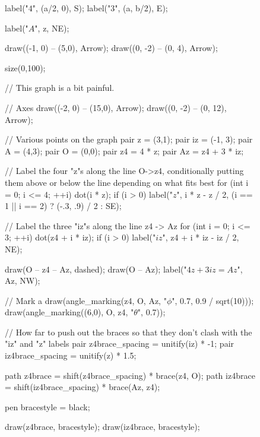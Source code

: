 \documentclass[../textbook.tex]{subfiles}
\begin{document}
\begin{figure}[h]
\begin{center}
\begin{minipage}[b]{0.25\textwidth}
\begin{asy}[width=\textwidth]
				label("$4$", (a/2, 0), S);
				label("$3$", (a, b/2), E);

				label("$A$", z, NE);

				draw((-1, 0) -- (5,0), Arrow);
				draw((0, -2) -- (0, 4), Arrow);
			\end{asy}
		\end{minipage}
		\hfill
		\begin{minipage}[b]{0.4\textwidth}
			\centering
			\begin{asy}[width=0.7\textwidth]
				size(0,100);

				// This graph is a bit painful.

				// Axes
				draw((-2, 0) -- (15,0), Arrow);
				draw((0, -2) -- (0, 12), Arrow);

				// Various points on the graph
				pair z = (3,1);
				pair iz = (-1, 3);
				pair A = (4,3);
				pair O = (0,0);
				pair z4 = 4 * z;
				pair Az = z4 + 3 * iz;

				// Label the four "z"s along the line O->z4, conditionally putting them above or below the line depending on what fits best
				for (int i = 0; i <= 4; ++i) {
					dot(i * z);
					if (i > 0) label("$z$", i * z - z / 2, (i == 1 || i == 2) ? (-.3, .9) / 2 : SE);
				}

				// Label the three "iz"s along the line z4 -> Az
				for (int i = 0; i <= 3; ++i) {
					dot(z4 + i * iz);
					if (i > 0) label("$iz$", z4 + i * iz - iz / 2, NE);
				}

				draw(O -- z4 -- Az, dashed);
				draw(O -- Az);
				label("$4z + 3iz = Az$", Az, NW);

				// Mark a
				draw(angle_marking(z4, O, Az, "$\phi$", 0.7, 0.9 / sqrt(10)));
				draw(angle_marking((6,0), O, z4, "$\theta$", 0.7));

				// How far to push out the braces so that they don't clash with the "iz" and "z" labels
				pair z4brace_spacing = unitify(iz) * -1;
				pair iz4brace_spacing = unitify(z) * 1.5;

				path z4brace = shift(z4brace_spacing) * brace(z4, O);
				path iz4brace = shift(iz4brace_spacing) * brace(Az, z4);

				pen bracestyle = black;

				draw(z4brace, bracestyle);
				draw(iz4brace, bracestyle);


\end{asy}
\end{minipage}
\end{center}
\end{figure}
\end{document}
